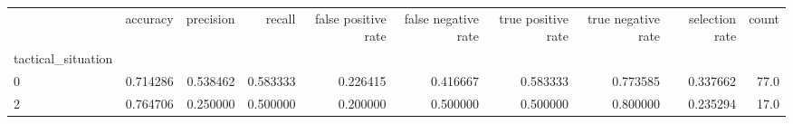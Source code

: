 \begin{tabular}{lrrrrrrrrr}
\toprule
{} &  accuracy &  precision &    recall &  false positive rate &  false negative rate &  true positive rate &  true negative rate &  selection rate &  count \\
tactical\_situation &           &            &           &                      &                      &                     &                     &                 &        \\
\midrule
0                  &  0.714286 &   0.538462 &  0.583333 &             0.226415 &             0.416667 &            0.583333 &            0.773585 &        0.337662 &   77.0 \\
2                  &  0.764706 &   0.250000 &  0.500000 &             0.200000 &             0.500000 &            0.500000 &            0.800000 &        0.235294 &   17.0 \\
\bottomrule
\end{tabular}

